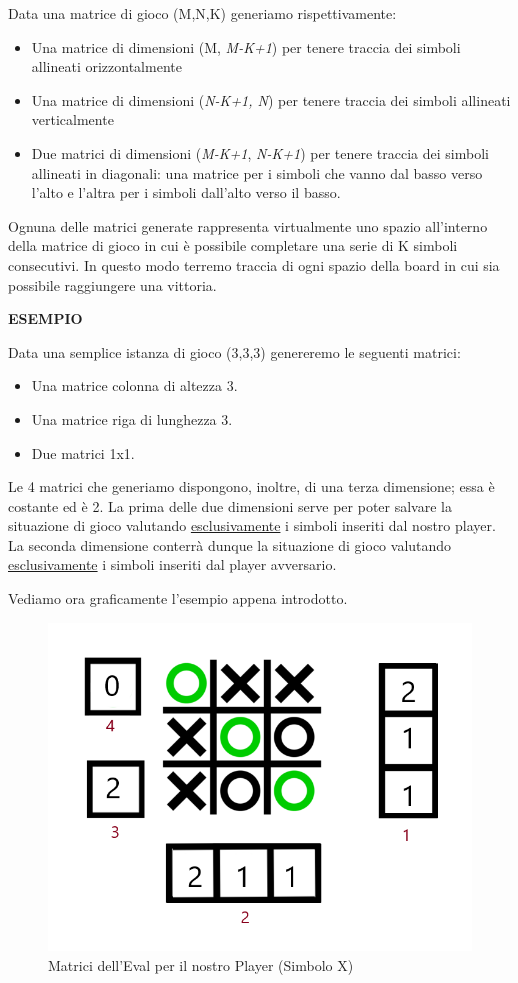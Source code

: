 \documentclass{article}
\begin{document}
Data una matrice di gioco (M,N,K) generiamo rispettivamente:
\begin{itemize}
\item Una matrice di dimensioni (M, \textit{M-K+1}) per tenere traccia dei simboli allineati orizzontalmente
\item Una matrice di dimensioni (\textit{N-K+1, N}) per tenere traccia dei simboli allineati verticalmente
\item Due matrici di dimensioni (\textit{M-K+1}, \textit{N-K+1}) per tenere traccia dei simboli allineati in diagonali: una matrice per i simboli che vanno dal basso verso l'alto e l'altra per i simboli dall'alto verso il basso.
\end{itemize}

Ognuna delle matrici generate rappresenta virtualmente uno spazio all'interno della matrice di gioco in cui è possibile completare una serie di K simboli consecutivi. 
In questo modo terremo traccia di ogni spazio della board in cui sia possibile raggiungere una vittoria.

\newpage

\textbf{ESEMPIO}

\medskip
Data una semplice istanza di gioco (3,3,3) genereremo le seguenti matrici:
\begin{itemize}
\item Una matrice colonna di altezza 3.
\item Una matrice riga di lunghezza 3.
\item Due matrici 1x1.
\end{itemize}

Le 4 matrici che generiamo dispongono, inoltre, di una terza dimensione; essa è costante ed è 2. La prima delle due dimensioni serve per poter salvare la situazione di gioco valutando \underline{esclusivamente} i simboli inseriti dal nostro player. La seconda dimensione conterrà dunque la situazione di gioco valutando \underline{esclusivamente} i simboli inseriti dal player avversario.
\medskip

Vediamo ora graficamente l'esempio appena introdotto.

\begin{figure}[!h]
\centering
\includegraphics[width=0.5\columnwidth]{MatriciEvalNostre.png}
\caption{Matrici dell'Eval per il nostro Player (Simbolo X)}
\end{figure}
\end{document}
